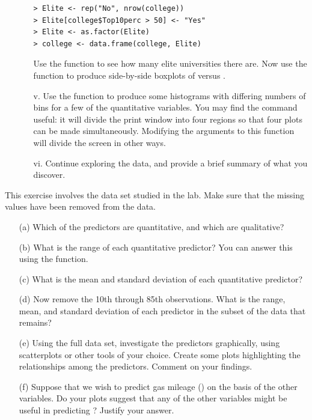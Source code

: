 \documentclass[12pt]{report}
\begin{document}
\begin{exercise}
\begin{enumerate}
\begin{enumerate}
\begin{lstlisting}
> Elite <- rep("No", nrow(college))
> Elite[college$Top10perc > 50] <- "Yes"
> Elite <- as.factor(Elite)
> college <- data.frame(college, Elite)
\end{lstlisting}

        Use the  function to see how many elite universities there are. Now use the  function to produce side-by-side boxplots of  versus .
        
        \item[v.] Use the  function to produce some histograms with differing numbers of bins for a few of the quantitative variables. You may find the command  useful: it will divide the print window into four regions so that four plots can be made simultaneously. Modifying the arguments to this function will divide the screen in other ways.
        
        \item[vi.] Continue exploring the data, and provide a brief summary of what you discover.
    \end{enumerate}
\end{enumerate}
\end{exercise}

\begin{exercise}
This exercise involves the  data set studied in the lab. Make sure that the missing values have been removed from the data.
\begin{enumerate}
    \item[(a)] Which of the predictors are quantitative, and which are qualitative?
    \item[(b)] What is the range of each quantitative predictor? You can answer this using the  function.
    \item[(c)] What is the mean and standard deviation of each quantitative predictor?
    \item[(d)] Now remove the 10th through 85th observations. What is the range, mean, and standard deviation of each predictor in the subset of the data that remains?
    \item[(e)] Using the full data set, investigate the predictors graphically, using scatterplots or other tools of your choice. Create some plots highlighting the relationships among the predictors. Comment on your findings.
    \item[(f)] Suppose that we wish to predict gas mileage () on the basis of the other variables. Do your plots suggest that any of the other variables might be useful in predicting ? Justify your answer.
\end{enumerate}
\end{exercise}
\end{document}
